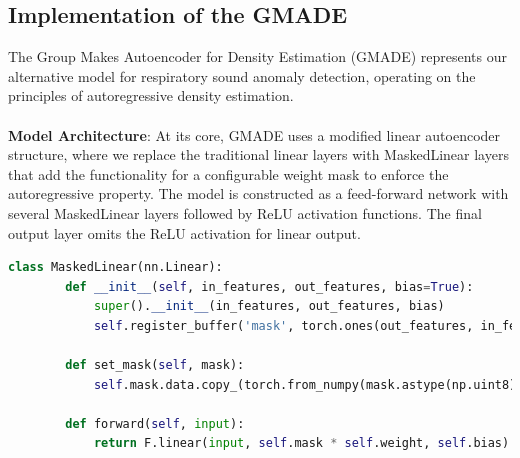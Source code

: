 \subsection{Implementation of the GMADE}
The Group Makes Autoencoder for Density Estimation (GMADE) represents our alternative model for respiratory sound anomaly detection, operating on the principles of autoregressive density estimation.\\\\
\textbf{Model Architecture}: At its core, GMADE uses a modified linear autoencoder structure, where we replace the traditional linear layers with MaskedLinear layers that add the functionality for a configurable weight mask to enforce the autoregressive property. The model is constructed as a feed-forward network with several MaskedLinear layers followed by ReLU activation functions. The final output layer omits the ReLU activation for linear output.
\begin{lstlisting}[language=Python,caption={MaskedLinear PyTorch implementation as described by Karpathy, Andrej (2018)~\cite{githubMADE}}]
    class MaskedLinear(nn.Linear):    
        def __init__(self, in_features, out_features, bias=True):
            super().__init__(in_features, out_features, bias)        
            self.register_buffer('mask', torch.ones(out_features, in_features))
        
        def set_mask(self, mask):
            self.mask.data.copy_(torch.from_numpy(mask.astype(np.uint8).T))
            
        def forward(self, input):
            return F.linear(input, self.mask * self.weight, self.bias)
\end{lstlisting}


